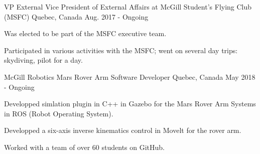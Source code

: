 
\begin{cventries}
\cventry
    {VP External}
    {Vice President of External Affairs at McGill Student's Flying Club (MSFC)}
    {Quebec, Canada}
    {Aug. 2017 - Ongoing}
    {
      \begin{cvitems}
        \item {Was elected to be part of the MSFC executive team.}
        \item {Participated in various activities with the MSFC; went on several day trips: skydiving, pilot for a day.}
      \end{cvitems}
    }    \newline

\cventry
    {McGill Robotics}
    {Mars Rover Arm Software Developer}
    {Quebec, Canada}
    {May 2018 - Ongoing}
    {
      \begin{cvitems}
        \item {Developped simlation plugin in C++ in Gazebo for the Mars Rover Arm Systems in ROS (Robot Operating System).}
        \item {Developped a six-axis inverse kinematics control in Movelt for the rover arm.}
        \item {Worked with a team of over 60 students on GitHub.}
      \end{cvitems}
    }    \newline

\end{cventries}

